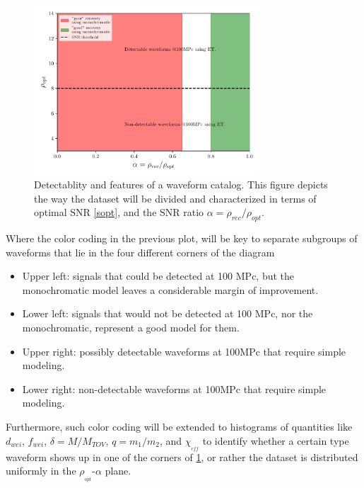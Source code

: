 \begin{figure}[hbt!]
\begin{center}
\includegraphics[width=0.75\textwidth, angle=0]{images/Data_analysis/results/schematics.pdf}
\captionsetup{width=0.8\textwidth}
\caption[Detectablity and features of a waveform catalog]{Detectablity and features of a waveform catalog. This figure depicts the way the dataset will be divided and characterized in terms of optimal SNR \ref{sopt}, and the SNR ratio $\alpha=\rho_{rec}/\rho_{opt}$.}
\label{regions}
\end{center} 
\end{figure}

\FloatBarrier

Where the color coding in the previous plot, will be key to separate subgroups of waveforms that lie in the four different corners of the diagram

\begin{itemize}
\item Upper left: signals that could be detected at 100 MPc, but the monochromatic model leaves a considerable margin of improvement.
\item Lower left: signals that would not be detected at 100 MPc, nor the monochromatic, represent a good model for them.
\item 
Upper right: possibly detectable waveforms at 100MPc that require simple modeling.
\item 
Lower right: non-detectable waveforms at 100MPc that require simple modeling.
\end{itemize}

Furthermore, such color coding will be extended to histograms of quantities like $d_{wei}$, $f_{wei}$, $\delta=M/M_{TOV}$, $q=m_1/m_2$, and  $\chi_{_{eff}}$ to identify whether a certain type waveform shows up in one of the corners of  \ref{regions}, or rather the dataset is distributed uniformly in the $\rho_{_{opt}}$-$\alpha$ plane.



